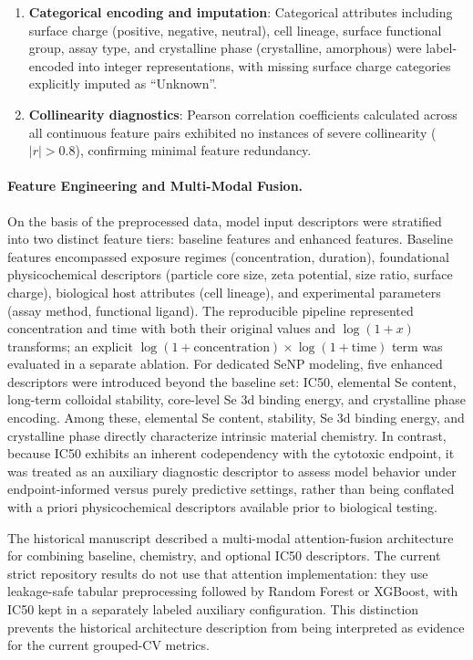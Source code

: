\begin{enumerate}
  \item \textbf{Categorical encoding and imputation}: Categorical attributes including surface charge (positive, negative, neutral), cell lineage, surface functional group, assay type, and crystalline phase (crystalline, amorphous) were label-encoded into integer representations, with missing surface charge categories explicitly imputed as ``Unknown''.

  \item \textbf{Collinearity diagnostics}: Pearson correlation coefficients calculated across all continuous feature pairs exhibited no instances of severe collinearity ($|r| > 0.8$), confirming minimal feature redundancy.
\end{enumerate}

\paragraph{Feature Engineering and Multi-Modal Fusion.}
On the basis of the preprocessed data, model input descriptors were stratified into two distinct feature tiers: baseline features and enhanced features. Baseline features encompassed exposure regimes (concentration, duration), foundational physicochemical descriptors (particle core size, zeta potential, size ratio, surface charge), biological host attributes (cell lineage), and experimental parameters (assay method, functional ligand). The reproducible pipeline represented concentration and time with both their original values and $\log(1+x)$ transforms; an explicit $\log(1+\mathrm{concentration})\times\log(1+\mathrm{time})$ term was evaluated in a separate ablation. For dedicated SeNP modeling, five enhanced descriptors were introduced beyond the baseline set: IC50, elemental Se content, long-term colloidal stability, core-level Se 3d binding energy, and crystalline phase encoding. Among these, elemental Se content, stability, Se 3d binding energy, and crystalline phase directly characterize intrinsic material chemistry. In contrast, because IC50 exhibits an inherent codependency with the cytotoxic endpoint, it was treated as an auxiliary diagnostic descriptor to assess model behavior under endpoint-informed versus purely predictive settings, rather than being conflated with a priori physicochemical descriptors available prior to biological testing.

The historical manuscript described a multi-modal attention-fusion architecture for combining baseline, chemistry, and optional IC50 descriptors. The current strict repository results do not use that attention implementation: they use leakage-safe tabular preprocessing followed by Random Forest or XGBoost, with IC50 kept in a separately labeled auxiliary configuration. This distinction prevents the historical architecture description from being interpreted as evidence for the current grouped-CV metrics.

